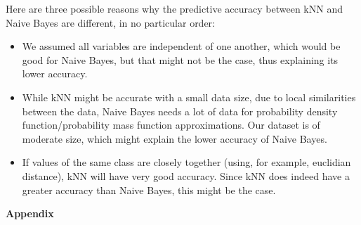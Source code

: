 \documentclass[12pt]{article}
\begin{document}
\begin{enumerate}[leftmargin=\labelsep,resume]
          Here are three possible reasons why the predictive accuracy between kNN and Naive Bayes are different, in no particular order:

          \begin{itemize}
              \item We assumed all variables are independent of one another,
                    which would be good for Naive Bayes, but that might not
                    be the case, thus explaining its lower accuracy.
              \item While kNN might be accurate with a small data size, due to
                    local similarities between the data, Naive Bayes needs a lot
                    of data for probability density function/probability
                    mass function approximations.
                    Our dataset is of moderate size, which might explain
                    the lower accuracy of Naive Bayes.
              \item If values of the same class are closely together
                    (using, for example, euclidian distance),
                    kNN will have very good accuracy.
                    Since kNN does indeed have a greater accuracy than
                    Naive Bayes, this might be the case.
          \end{itemize}
\end{enumerate}

\pagebreak

\center\large{\textbf{Appendix}\vskip 0.3cm}




\end{document}
